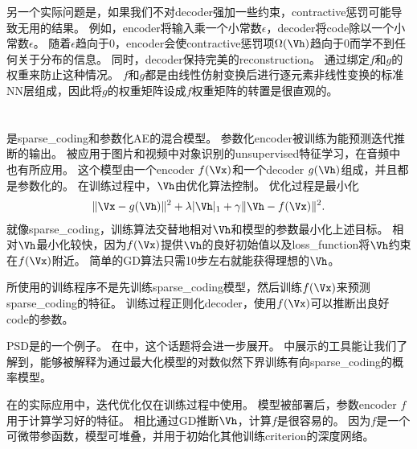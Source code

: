 另一个实际问题是，如果我们不对\gls{decoder}强加一些约束，\gls{contractive}惩罚可能导致无用的结果。
例如，\gls{encoder}将输入乘一个小常数$\epsilon$，\gls{decoder}将\gls{code}除以一个小常数$\epsilon$。
随着$\epsilon$趋向于0，\gls{encoder}会使\gls{contractive}惩罚项$\Omega(\Vh)$趋向于0而学不到任何关于分布的信息。
同时，\gls{decoder}保持完美的\gls{reconstruction}。
\citet{Rifai+al-2011-small}通过绑定$f$和$g$的权重来防止这种情况。
$f$和$g$都是由线性仿射变换后进行逐元素非线性变换的标准\gls{NN}层组成，因此将$g$的权重矩阵设成$f$权重矩阵的转置是很直观的。


\section{}
\label{sec:predictive_sparse_decomposition}

是\gls{sparse_coding}和参数化\gls{AE}\citep{koray-psd-08}的混合模型。
参数化\gls{encoder}被训练为能预测迭代推断的输出。
被应用于图片和视频中对象识别的\gls{unsupervised}特征学习\citep{Koray-08-small,koray-nips-10-small,Jarrett-ICCV2009-small,farabet-suml-11}，在音频中也有所应用\citep{henaff-ismir-11-small}。
这个模型由一个\gls{encoder} $f(\Vx)$和一个\gls{decoder} $g(\Vh)$组成，并且都是参数化的。
在训练过程中，$\Vh$由优化算法控制。
优化过程是最小化
\begin{align}
 \| \Vx - g(\Vh) \| ^2 + \lambda | \Vh |_1 + \gamma \| \Vh - f(\Vx) \|^2.
\end{align}
就像\gls{sparse_coding}，训练算法交替地相对$\Vh$和模型的参数最小化上述目标。
相对$\Vh$最小化较快，因为$f(\Vx)$提供$\Vh$的良好初始值以及\gls{loss_function}将$\Vh$约束在$f(\Vx)$附近。
简单的\gls{GD}算法只需10步左右就能获得理想的$\Vh$。


所使用的训练程序不是先训练\gls{sparse_coding}模型，然后训练$f(\Vx)$来预测\gls{sparse_coding}的特征。
训练过程正则化\gls{decoder}，使用$f(\Vx)$可以推断出良好\gls{code}的参数。


\gls{PSD}是的一个例子。
在中，这个话题将会进一步展开。
中展示的工具能让我们了解到，能够被解释为通过最大化模型的对数似然下界训练有向\gls{sparse_coding}的概率模型。


在的实际应用中，迭代优化仅在训练过程中使用。
模型被部署后，参数\gls{encoder} $f$用于计算学习好的特征。
相比通过\gls{GD}推断$\Vh$，计算$f$是很容易的。
因为$f$是一个可微带参函数，模型可堆叠，并用于初始化其他训练\gls{criterion}的深度网络。

